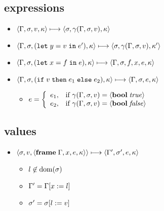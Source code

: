 \documentclass{article}
\begin{document}
\begin{minipage}{\textwidth}
\begin{minipage}[t]{0.50\textwidth}
\end{minipage}
\begin{minipage}[t]{0.50\textwidth}

\subsection{expressions}
\begin{itemize}
\item $\langle\Gamma,\sigma,v,\kappa\rangle \longmapsto \langle \sigma,\gamma(\Gamma,\sigma,v),\kappa \rangle$

\item $\langle\Gamma,\sigma,(\mathtt{let}\; y=v\; \mathtt{in}\; e'),\kappa\rangle \longmapsto \langle\sigma,\gamma(\Gamma,\sigma,v),\kappa'\rangle$

\item $\langle\Gamma,\sigma,(\mathtt{let}\; x=f\; \mathtt{in}\; e),\kappa\rangle \longmapsto \langle\Gamma,\sigma,f,x, e, \kappa\rangle$

\item $\langle\Gamma,\sigma,(\mathtt{if}\; v\; \mathtt{then}\; e_1\; \mathtt{else}\; e_2),\kappa\rangle \longmapsto \langle\Gamma,\sigma, e, \kappa\rangle$

\begin{itemize}
  \item $\displaystyle e = \left\{\begin{array}{rl}
e_1, & \text{if } \gamma(\Gamma,\sigma,v) = \langle\mathbf{bool}\; \mathit{true}\rangle \\
e_2, & \text{if } \gamma(\Gamma,\sigma,v) = \langle\mathbf{bool}\; \mathit{false}\rangle
\end{array}\right.$

\end{itemize}
\end{itemize}

\subsection{values}

\begin{itemize}
\item $\langle\sigma,v,\langle\mathbf{frame}\; \Gamma,x,e,\kappa\rangle\rangle \longmapsto \langle\Gamma',\sigma',e,\kappa\rangle$
\begin{itemize}
\item $l\not\in\operatorname{dom}(\sigma)$
\item $\Gamma' = \Gamma[x:= l]$
\item $\sigma' = \sigma[l:= v]$
\end{itemize}
\end{itemize}


\end{minipage}
\end{minipage}
\end{document}
